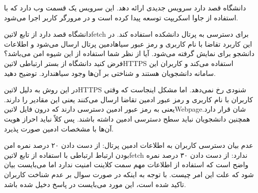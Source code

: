 
دانشگاه قصد دارد سرویس جدیدی ارائه دهد.
این سرویس یک قسمت وب دارد که با استفاده از جاوا اسکریپت توسعه پیدا
کرده است و در مرورگر کاربر اجرا می‌شود.

دانشگاه قصد دارد از تابع ‌لاتین{fetch} برای دسترسی به پرتال دانشکده استفاده کند.
در این کاربرد تقاضا با نام کاربری و رمز عبور ‌سیاه{ادمین} پرتال ارسال می‌شود و اطلاعات دانشجو برای نمایش گرفته می‌شود.
آیا از نظر شما استفاده از این شیوه امن می‌باشد؟ فرض کنید دانشگاه از بستر ارتباطی ‌لاتین{HTTPS} استفاده می‌کند و
کاربران این سامانه دانشجویان هستند و شناختی بر آن‌ها وجود ‌سیاه{ندارد}.
توضیح دهید.



در این روش به دلیل ‌لاتین{HTTPS} شنودی رخ نمی‌دهد.
اما مشکل اینجاست که وقتی کاربران با نام کاربری و رمز عبور ادمین تقاضا ارسال می‌کنند یعنی این مقادیر را دارند. یعنی به رمز عبور ادمین دسترسی دارند که درون فایل ‌لاتین{Webpage}شان قرار دارد.
همچنین دانشجویان نباید سطح دسترسی ادمین داشته باشند. پس کلاً نباید احراز هویت آن‌ها با مشخصات ادمین صورت پذیرد.

 عدم بیان دسترسی کاربران به اطلاعات ادمین پرتال: از دست دادن ۲۰ درصد نمره
 امن بودن ارتباط ارتباطی با استفاده از تابع ‌لاتین{fetch} ندارد: از دست دادن ۳۰ درصد نمره
 واضح است که استفاده از اطلاعات مهم سمت کلاینت امنیت ندارد اما می‌بایست بیان شود که علت این امر چیست.
 با توجه به اینکه در صورت سوال بر عدم شناخت کاربران تاکید شده است، این مورد می‌بایست در پاسخ دخیل شده باشد.

